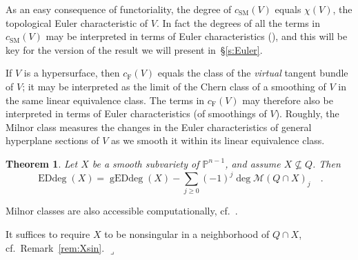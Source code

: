 \documentclass[11pt]{amsart}
\newtheorem{theorem}{Theorem}[section]
\numberwithin{equation}{section}
\newcommand{\Pbb}{{\mathbb{P}}}
\newcommand{\cM}{{\mathcal M}}
\newcommand{\csm}{{c_{\text{SM}}}}
\newcommand{\cf}{{c_{\text{F}}}}
\DeclareMathOperator{\Edd}{EDdeg}
\DeclareMathOperator{\gEdd}{gEDdeg}
\newcommand{\qede}{\hfill$\lrcorner$}
\begin{document}
As an easy consequence of functoriality, the degree of $\csm(V)$ equals $\chi(V)$, 
the topological Euler characteristic of $V$. In fact the degrees of all the terms in 
$\csm(V)$ may be interpreted in terms of Euler characteristics 
(\cite[Theorem~1.1]{MR3031565}), and this will be key for the version of the
result we will present in~\S\ref{s:Euler}.

If $V$ is a hypersurface, then $\cf(V)$ equals the class of the {\em virtual\/} tangent
bundle of $V$; it may be interpreted as the limit of the Chern class of a smoothing of
$V$ in the same linear equivalence class. The terms in $\cf(V)$ may therefore also
be interpreted in terms of Euler characteristics (of smoothings of $V$). Roughly,
the Milnor class measures the changes in the Euler characteristics of general hyperplane 
sections of $V$ as we smooth it within its linear equivalence class.

\begin{theorem}\label{thm:milnor}
Let $X$ be a smooth subvariety of $\Pbb^{n-1}$, and assume $X\not\subseteq Q$. Then 
\begin{equation}\label{eq:milnor}
\Edd(X) = \gEdd(X) - \sum_{j\ge 0} (-1)^j \deg\cM(Q\cap X)_j\quad.
\end{equation}
\end{theorem}

Milnor classes are also accessible computationally, cf.~\cite[Example~4.7]{MR1956868}.

\begin{remark}\label{rem:Xsin2}
It suffices to require $X$ to be nonsingular in a neighborhood of $Q\cap X$, 
cf.~Remark~\ref{rem:Xsin}.
\qede\end{remark}
\end{document}
